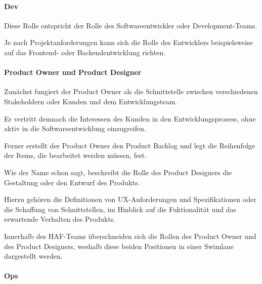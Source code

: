 \paragraph{Dev}

Diese Rolle entspricht der Rolle des Softwareentwickler oder Development-Teams. 

Je nach Projektanforderungen kann sich die Rolle des Entwicklers beispielsweise auf das Frontend- oder Backendentwicklung richten.

\paragraph{Product Owner und Product Designer}

Zunächst fungiert der Product Owner als die Schnittstelle zwischen verschiedenen Stakeholdern oder Kunden und dem Entwicklungsteam. 

Er vertritt demnach die Interessen des Kunden in den Entwicklungsprozess, ohne aktiv in die Softwareentwicklung einzugreifen.

Ferner erstellt der Product Owner den Product Backlog und legt die Reihenfolge der Items, die bearbeitet werden müssen, fest. 

Wie der Name schon sagt, beschreibt die Rolle des Product Designers die Gestaltung oder den Entwurf des Produkts. 

Hierzu gehören die Definitionen von UX-Anforderungen und Spezifikationen oder die Schaffung von Schnittstellen, im Hinblick auf die Fuktionalität und das erwartende Verhalten des Produkts. 

Innerhalb des HAF-Teams überschneiden sich die Rollen des Product Owner und des Product Designers, weshalb diese beiden Positionen in einer Swimlane dargestellt werden.  

\paragraph{Ops}

